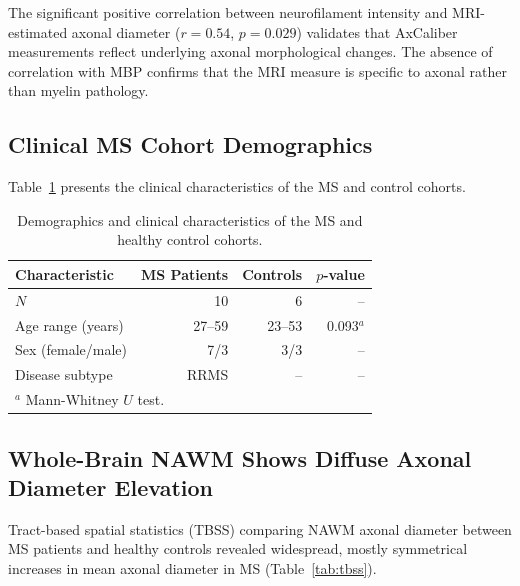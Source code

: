 \documentclass[11pt]{article}
\begin{document}
The significant positive correlation between neurofilament intensity and MRI-estimated axonal diameter ($r = 0.54$, $p = 0.029$) validates that AxCaliber measurements reflect underlying axonal morphological changes. The absence of correlation with MBP confirms that the MRI measure is specific to axonal rather than myelin pathology.

\subsection{Clinical MS Cohort Demographics}

Table~\ref{tab:demographics} presents the clinical characteristics of the MS and control cohorts.

\begin{table}[H]
\centering
\caption{Demographics and clinical characteristics of the MS and healthy control cohorts.}
\label{tab:demographics}
\begin{tabular}{lrrr}
\toprule
\textbf{Characteristic} & \textbf{MS Patients} & \textbf{Controls} & \textbf{$p$-value} \\
\midrule
$N$ & 10 & 6 & -- \\
Age range (years) & 27--59 & 23--53 & 0.093$^a$ \\
Sex (female/male) & 7/3 & 3/3 & -- \\
Disease subtype & RRMS & -- & -- \\
\bottomrule
\multicolumn{4}{l}{\footnotesize $^a$ Mann-Whitney $U$ test.}
\end{tabular}
\end{table}

\subsection{Whole-Brain NAWM Shows Diffuse Axonal Diameter Elevation}

Tract-based spatial statistics (TBSS) \citep{smith2006tract} comparing NAWM axonal diameter between MS patients and healthy controls revealed widespread, mostly symmetrical increases in mean axonal diameter in MS (Table~\ref{tab:tbss}).
\end{document}

